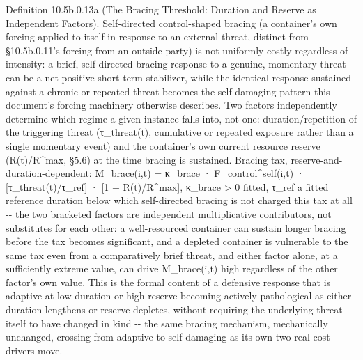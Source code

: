 \documentclass[
]{article}
\begin{document}
Definition 10.5b.0.13a (The Bracing Threshold: Duration and Reserve as
Independent Factors). Self-directed control-shaped bracing (a
container's own forcing applied to itself in response to an external
threat, distinct from §10.5b.0.11's forcing from an outside party) is
not uniformly costly regardless of intensity: a brief, self-directed
bracing response to a genuine, momentary threat can be a net-positive
short-term stabilizer, while the identical response sustained against a
chronic or repeated threat becomes the self-damaging pattern this
document's forcing machinery otherwise describes. Two factors
independently determine which regime a given instance falls into, not
one: duration/repetition of the triggering threat (τ\_threat(t),
cumulative or repeated exposure rather than a single momentary event)
and the container's own current resource reserve (R(t)/R\^{}max, §5.6)
at the time bracing is sustained. Bracing tax,
reserve-and-duration-dependent: M\_brace(i,t) = κ\_brace ·
F\_control\^{}self(i,t) · {[}τ\_threat(t)/τ\_ref{]} · {[}1 −
R(t)/R\^{}max{]}, κ\_brace \textgreater{} 0 fitted, τ\_ref a fitted
reference duration below which self-directed bracing is not charged this
tax at all -\/- the two bracketed factors are independent multiplicative
contributors, not substitutes for each other: a well-resourced container
can sustain longer bracing before the tax becomes significant, and a
depleted container is vulnerable to the same tax even from a
comparatively brief threat, and either factor alone, at a sufficiently
extreme value, can drive M\_brace(i,t) high regardless of the other
factor's own value. This is the formal content of a defensive response
that is adaptive at low duration or high reserve becoming actively
pathological as either duration lengthens or reserve depletes, without
requiring the underlying threat itself to have changed in kind -\/- the
same bracing mechanism, mechanically unchanged, crossing from adaptive
to self-damaging as its own two real cost drivers move.
\end{document}
